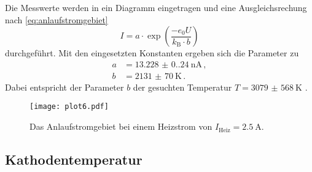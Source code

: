Die Messwerte werden in ein Diagramm eingetragen und eine Ausgleichsrechung nach \autoref{eq:anlaufstromgebiet}
\begin{equation}
  I=a \cdot \exp \left(\frac{-e_{0} U}{k_{\text{B}} \cdot b}\right)
\end{equation}
durchgeführt. Mit den eingesetzten Konstanten ergeben sich die Parameter zu
\begin{align*}
  a &= \qty{13.228(0.240)}{\nano\ampere} \, , \\
  b &= \qty{2131(70)}{\kelvin} \, . 
\end{align*}
Dabei entspricht der Parameter $b$ der gesuchten Temperatur $T = \qty{3079(568)}{\kelvin}$ .

\begin{figure}
  \centering
  \texttt{[image: plot6.pdf]}
  \caption{Das Anlaufstromgebiet bei einem Heizstrom von $I_\text{Heiz} = \qty{2,5}{\ampere}$.}
  \label{fig:anlaufstrom}
\end{figure}


\subsection{Kathodentemperatur}

